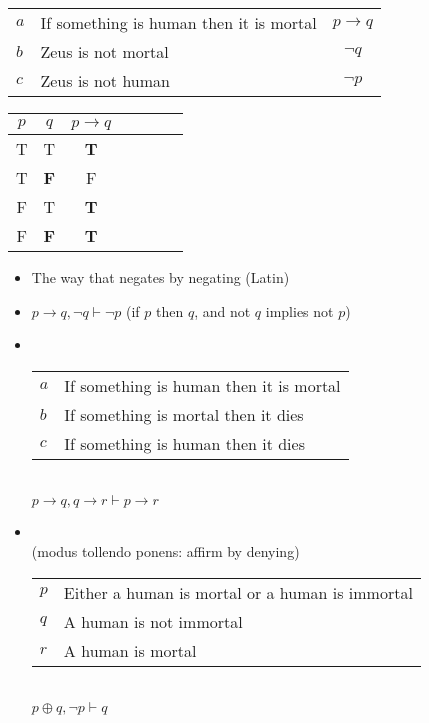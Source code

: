 \documentclass[a4paper,landscape,headrule,footrule,xetex]{foils}
\begin{document}
\begin{center}
  \begin{tabular}{llc}
    $a$ & If something is human then it is mortal & $p  \rightarrow q$\\
    $b$ & Zeus is not mortal  & $\neg q$ \\ \hline
    $c$ & Zeus is not human   & $\neg p$
  \end{tabular}

  \begin{tabular}{|c|c|c|c|c|c|c|}
    \hline
    $p$ & $q$ & $p \rightarrow q$  \\
    \hline
    T & T & \textbf{T}  \\ 
    T & \textbf{F} & F  \\ 
    F & T & \textbf{T}  \\ 
    \rowcolor{Gray}
    F & \textbf{F} & \textbf{T}  \\ 
    \hline
  \end{tabular}
\end{center}
\begin{itemize}
\item  The way that negates by negating (Latin)
\item $p \rightarrow q, \neg q \vdash \neg p$   (if $p$ then $q$, and not $q$  implies not $p$)
\end{itemize}


\begin{itemize}
\item {}
\\[2ex]
 \begin{tabular}{ll}
    $a$ & If something is human then it is mortal \\
    $b$ & If something is mortal then it dies \\ \hline
    $c$ & If something is human then it dies
  \end{tabular}
\\ $p \rightarrow q, q \rightarrow r \vdash p \rightarrow r$

\item {}
\\ (modus tollendo ponens: affirm by denying)
\\[2ex]
 \begin{tabular}{ll}
    $p$ & Either a human is mortal or a human is immortal \\
    $q$ & A human is not immortal \\ \hline
    $r$ & A human is mortal
  \end{tabular}
\\ $p \oplus q, \neg p \vdash q$
\end{itemize}
\end{document}
